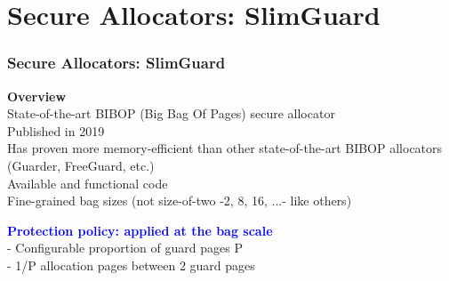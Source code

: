 \documentclass[xcolor=table,bigger,unknownkeysallowed]{beamer}
\newcommand{\blueemph}[1]{\textcolor{blue}{\bf #1}}
\begin{document}
\section{Secure Allocators: SlimGuard}
\begin{frame}
	\frametitle{Secure Allocators: SlimGuard} 
	\textbf{Overview}\\
	\vspace*{.5cm}
	 State-of-the-art BIBOP (Big Bag Of Pages) secure allocator\\
	 Published in 2019\\
	 Has proven more memory-efficient than other state-of-the-art BIBOP allocators (Guarder, FreeGuard, etc.)\\
	 Available and functional code\\
	\pause
	 Fine-grained bag sizes (not size-of-two -2, 8, 16, ...- like others)
	\vspace*{-.3cm}
	\begin{figure}
		\centering
	\end{figure} 
	\pause
	\blueemph{Protection policy: applied at the bag scale}\\ 
	- Configurable proportion of guard pages P\\
	- 1/P allocation pages between 2 guard pages		
\end{frame}
\end{document}
